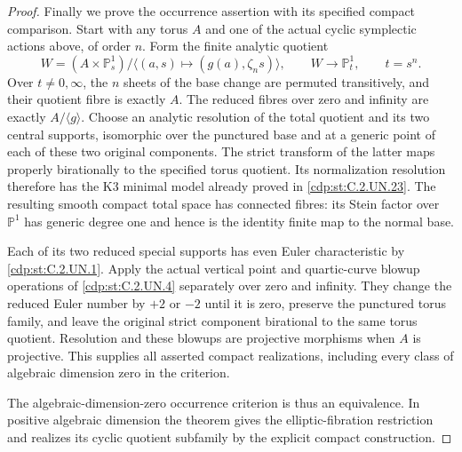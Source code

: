 \begin{proof}
Finally we prove the occurrence assertion with its
specified compact comparison. Start with any torus
$A$ and one of the actual cyclic symplectic actions
above, of order $n$. Form the finite analytic quotient
\[
 W=(A\times\mathbb P^1_s)/
       \langle(a,s)\mapsto(g(a),\zeta_ns)\rangle,
 \qquad W\longrightarrow\mathbb P^1_t,
 \qquad t=s^n.
                                                               \tag{C.K3.10}\label{cdp:eq:C.K3.10}
\]
Over $t\ne0,\infty$, the $n$ sheets of the base
change are permuted transitively, and their quotient
fibre is exactly $A$. The reduced fibres over zero
and infinity are exactly $A/\langle g\rangle$.
Choose an analytic resolution of the total quotient
and its two central supports, isomorphic over the
punctured base and at a generic point of each of
these two original components. The strict transform
of the latter maps properly birationally to the
specified torus quotient. Its normalization resolution
therefore has the K3 minimal model already proved
in \ref{cdp:st:C.2.UN.23}. The resulting smooth compact total
space has connected fibres: its Stein factor over
$\mathbb P^1$ has generic degree one and hence is
the identity finite map to the normal base.

Each of its two reduced special supports has even
Euler characteristic by \ref{cdp:st:C.2.UN.1}. Apply the actual
vertical point and quartic-curve blowup operations
of \ref{cdp:st:C.2.UN.4} separately over zero and infinity.
They change the reduced Euler number by $+2$ or
$-2$ until it is zero, preserve the punctured torus
family, and leave the original strict component
birational to the same torus quotient. Resolution
and these blowups are projective morphisms when
$A$ is projective. This supplies all asserted
compact realizations, including every class of
algebraic dimension zero in the criterion.

The algebraic-dimension-zero occurrence criterion
is thus an equivalence. In positive algebraic
dimension the theorem gives the elliptic-fibration
restriction and realizes its cyclic quotient
subfamily by the explicit compact construction.
\end{proof}


